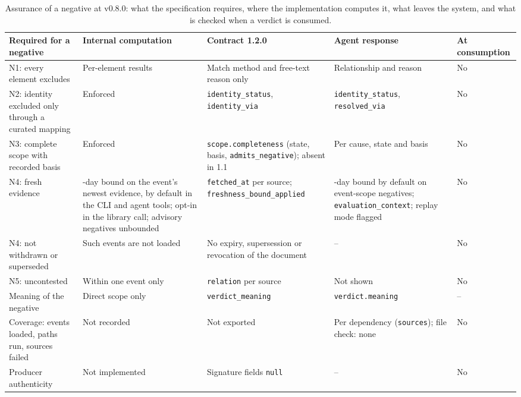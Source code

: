 \documentclass[11pt,a4paper]{article}
\newcommand{\code}[1]{\texttt{#1}}
\newcommand{\release}{v0.8.0}
\begin{document}
\begin{table}[t]
\centering
\footnotesize
\begin{tabularx}{\linewidth}{@{}>{\raggedright\arraybackslash}p{3.0cm} >{\raggedright\arraybackslash}X >{\raggedright\arraybackslash}X >{\raggedright\arraybackslash}X >{\raggedright\arraybackslash}p{1.5cm}@{}}
\toprule
Required for a negative & Internal computation & Contract 1.2.0 & Agent response & At consumption \\
\midrule
N1: every element excludes & Per-element results & Match method and
  free-text reason only & Relationship and reason & No \\
N2: identity excluded only through a curated mapping & Enforced &
  \code{identity\_status}, \code{identity\_via} & \code{identity\_status},
  \code{resolved\_via} & No \\
N3: complete scope with recorded basis & Enforced &
  \code{scope.\allowbreak completeness} (state, basis, \code{admits\_\allowbreak negative}); absent
  in 1.1 & Per cause, state and basis & No \\
N4: fresh evidence & 90-day bound on the event's newest evidence, by
  default in the CLI and agent tools; opt-in in the library call;
  advisory negatives unbounded &
  \code{fetched\_at} per source; \code{freshness\_\allowbreak bound\_\allowbreak applied} &
  90-day bound by default on event-scope negatives;
  \code{evaluation\_\allowbreak context}; replay mode flagged & No \\
N4: not withdrawn or superseded & Such events are not loaded & No
  expiry, supersession or revocation of the document & -- & No \\
N5: uncontested & Within one event only & \code{relation} per source &
  Not shown & No \\
Meaning of the negative & Direct scope only & \code{verdict\_meaning} &
  \code{verdict.meaning} & -- \\
Coverage: events loaded, paths run, sources failed & Not recorded &
  Not exported & Per dependency (\code{sources}); file check: none &
  No \\
Producer authenticity & Not implemented & Signature fields \code{null}
  & -- & No \\
\bottomrule
\end{tabularx}
\caption{Assurance of a negative at \release{}: what the
specification requires, where the implementation computes it, what
leaves the system, and what is checked when a verdict is consumed.}
\label{tab:assurance}
\end{table}
\end{document}

